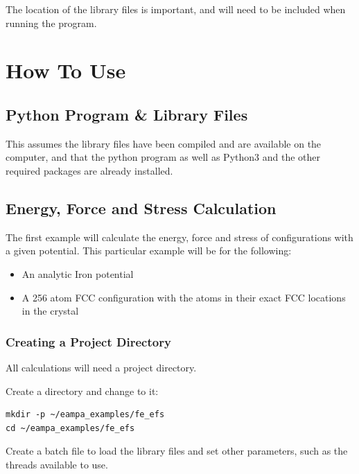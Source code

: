 \documentclass[12pt,twoside]{manual}
\begin{document}
The location of the library files is important, and will need to be included when running the program.








\chapter{How To Use}

\section{Python Program \& Library Files}

This assumes the library files have been compiled and are available on the computer, and that the python program as well as Python3 and the other required packages are already installed.


\section{Energy, Force and Stress Calculation}

The first example will calculate the energy, force and stress of configurations with a given potential.  This particular example will be for the following:

\begin{itemize}
\item An analytic Iron potential
\item A 256 atom FCC configuration with the atoms in their exact FCC locations in the crystal
\end{itemize}



\subsection{Creating a Project Directory}

All calculations will need a project directory.

Create a directory and change to it:

\begin{lstlisting}
mkdir -p ~/eampa_examples/fe_efs
cd ~/eampa_examples/fe_efs
\end{lstlisting}

Create a batch file to load the library files and set other parameters, such as the threads available to use.
\end{document}
